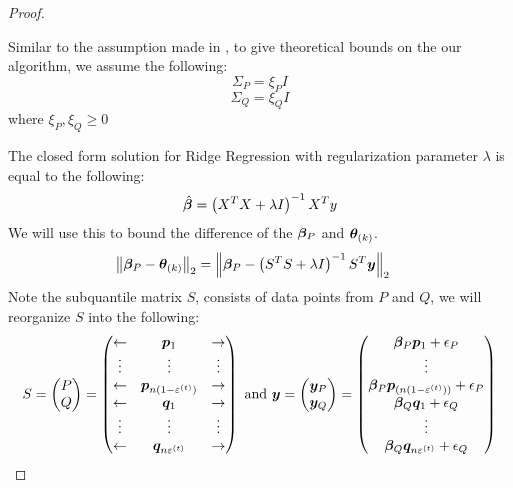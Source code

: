 \documentclass{article} %
\newcommand{\norm}[1]{\left\lVert#1\right\rVert}
\begin{document}
\begin{appendices}
\begin{proof}
	\begin{assumption}\label{asm:identity-covariance}
		Similar to the assumption made in \cite{bhatia2017}, to give theoretical bounds on the our algorithm, we assume the following:
		\begin{equation}
			\Sigma_P = \xi_P I
		\end{equation}
		\begin{equation} 
			\Sigma_Q = \xi_Q I
		\end{equation}
		where $\xi_P,\xi_Q \geq 0$ 
	\end{assumption}
	The closed form solution for Ridge Regression with regularization parameter $\lambda$ is equal to the following:
	\begin{equation}
		\hat{{\bm{\beta}}} = \left(X^T X+ \lambda I\right)^{-1}X^T y
	\end{equation}
	We will use this to bound the difference of the ${\bm{\beta}}_P$ and ${\bm{\theta}}_{(k)}$.
	\begin{align*}
		\norm{\vbeta_P - \vtheta_{(k)}}_2 &= \norm{\vbeta_P - \left(S^T S + \lambda I\right)^{-1}S^T \vy}_2 &&\\
	\end{align*}
	Note the subquantile matrix $S$, consists of data points from $P$ and $Q$, we will reorganize $S$ into the following:
	\begin{equation*}
		S = \begin{pmatrix}P \\ Q \end{pmatrix} = 
		\begin{pmatrix}
			\leftarrow & \vp_1 & \rightarrow \\
			\vdots & \vdots & \vdots \\
			\leftarrow & \vp_{n(1-\varepsilon^{(t)})} & \rightarrow\\
			\leftarrow & \vq_1 & \rightarrow \\
			\vdots & \vdots & \vdots \\
			\leftarrow & \vq_{n\varepsilon^{(t)}} & \rightarrow
		\end{pmatrix}\text{ and } \vy = \begin{pmatrix}\vy_P \\ \vy_Q \end{pmatrix} = \begin{pmatrix} \vbeta_P\vp_1 + \eps_P \\ \vdots \\ \vbeta_P\vp_{(n(1-\varepsilon^{(t)}))} + \eps_P \\ \vbeta_Q\vq_1 + \eps_Q\\ \vdots \\ \vbeta_Q\vq_{n\varepsilon^{(t)}} + \eps_Q\end{pmatrix}

\end{equation*}
\end{proof}
\end{appendices}
\end{document}
